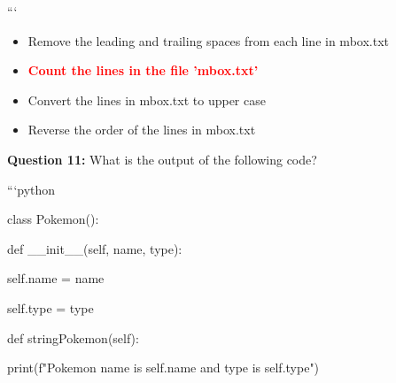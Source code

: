 \documentclass[12pt,a4paper]{article}
\begin{document}
\newline
```

\begin{itemize}
    \item[\textbf{A.}] Remove the leading and trailing spaces from each line in mbox.txt
    \item[\textbf{B.}] \textcolor{red}{\textbf{Count the lines in the file 'mbox.txt'}}
    \item[\textbf{C.}] Convert the lines in mbox.txt to upper case
    \item[\textbf{D.}] Reverse the order of the lines in mbox.txt
\end{itemize}

\vspace{0.5cm}

\textbf{Question 11:} What is the output of the following code?\newline

\newline
\newline

\newline
```python\newline

\newline
class Pokemon():\newline

\newline
\newline

\newline
    def __init__(self, name, type):\newline

\newline
        self.name = name\newline

\newline
        self.type = type\newline

\newline
\newline

\newline
    def stringPokemon(self):\newline

\newline
        print(f"Pokemon name is self.name and type is self.type")\newline

\newline
\newline
\end{document}
